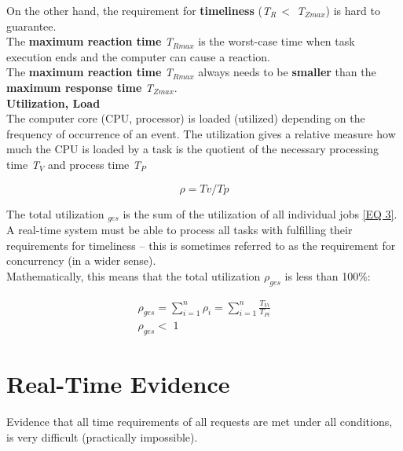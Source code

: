 On the other hand, the requirement for \textbf{timeliness} (\textit{T${}_{R\ }$}$\mathrm{<}$ \textit{T${}_{Zmax}$}) is hard to guarantee. \\

The \textbf{maximum reaction time} \textit{T${}_{Rmax}$} is the worst-case time when task execution ends and the computer can cause a reaction. \\

The \textbf{maximum reaction time} \textit{T${}_{Rmax}$} always needs to be \textbf{smaller} than the \textbf{maximum response time} \textit{T${}_{Zmax}$}.\\

{\rot\bf Utilization, Load}\\

The computer core (CPU, processor) is loaded (utilized) depending on the frequency of occurrence of an event. The utilization  gives a relative measure how much the CPU is loaded by a task is the quotient of the necessary processing time \textit{T${}_{V}$} and process time \textit{T${}_{P}$}

\begin{equation}
	\rho = Tv/Tp
\label{EQ 2}
\end{equation}
	
The total utilization ${}_{ges}$ is the sum of the utilization of all individual jobs \ref{EQ 3}. A real-time system must be able to process all tasks with fulfilling their requirements for timeliness -- this is sometimes referred to as the requirement for concurrency (in a wider sense).\\

 Mathematically, this means that the total utilization \textit{${\rho}_{ges}$} is less than 100\%:

\begin{equation}
	\begin{array}{l} {\rho _{ges} =\sum _{i=1}^{n}\rho _{i} = \sum _{i=1}^{n}\frac{T_{Vi} }{T_{Pi} }  } \\ {\rho _{ges} <\, \, 1} \end{array}
\label{EQ 3}
\end{equation}

\section{Real-Time Evidence}

Evidence that all time requirements of all requests are met under all conditions, is very difficult (practically impossible). \\

